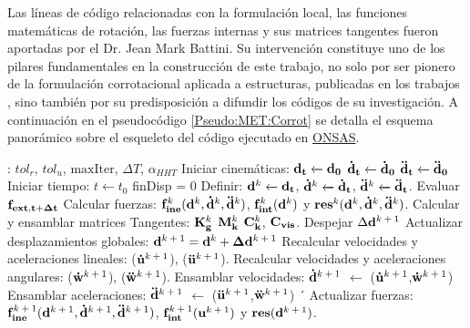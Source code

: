 Las líneas de código relacionadas con la formulación local, las funciones matemáticas de rotación, las fuerzas internas y sus matrices tangentes fueron aportadas por el Dr. Jean Mark Battini. Su intervención constituye uno de los pilares fundamentales en la construcción de este trabajo, no solo por ser pionero de la formulación corrotacional aplicada a estructuras, publicadas en los trabajos \citep{Battini2002} \citep{Le2014}, sino también por su predisposición a difundir los códigos de su investigación. A continuación en el pseudocódigo \ref{Pseudo:MET:Corrot} se detalla el esquema panorámico sobre el esqueleto del código ejecutado en \href{https://github.com/ONSAS/ONSAS.m/}{ONSAS}. 

\begin{algorithm}
	\begin{algorithmic} 
		\REQUIRE: $tol_r$, $tol_u$, $\text{maxIter}$, $\Delta T$, $\alpha_{HHT}$
		\STATE Iniciar cinemáticas: $\bf{d_t}\xleftarrow[]{}\bf{d_0}$
		$\bf{\dot{d}_t}\xleftarrow[]{}\bf{\dot{d}_0}$
		$\bf{\ddot{d}_t}\xleftarrow[]{}\bf{\ddot{d}_0}$ 
		\STATE Iniciar tiempo: $t\xleftarrow{}t_0$
		\STATE finDisp = $0$
		\STATE Definir: $\bf{d^\text{$k$}}\xleftarrow[]{}\bf{d_t}$, $\bf{\dot{d}^\text{$k$}}\xleftarrow[]{}\bf{\dot{d}_t}$, $\bf{\ddot{d}^\text{$k$}}\xleftarrow[]{}\bf{\ddot{d}_t}$.
		\STATE Evaluar $\bf{f_{ext,t+\Delta t}}$	
		\STATE Calcular fuerzas: $\bf{f}_{ine}^\text{$k$}(\bf{d}^\text{$k$},\bf{\dot{d}}^\text{$k$},\bf{\ddot{d}}^\text{$k$})$,  $\bf{f}_{int}^\text{$k$}(\bf{d}^\text{$k$})$ y $\bf{res}^{\text{$k$}}(\bf{d}^\text{$k$},\bf{\dot{d}}^\text{$k$},\bf{\ddot{d}}^\text{$k$})$. 
		\STATE Calcular y ensamblar matrices Tangentes: $\bf{K}_g^\text{$k$}$ $\bf{M}_k^\text{$k$}$  $\bf{C}_k^\text{$k$}$, $\bf{C}_{vis}$. 
		\STATE Despejar $\Delta \bf{d}^\text{$k+1$}$ 
		\STATE Actualizar desplazamientos globales:  $\bf{d}^\text{$k+1$} = \bf{d}^\text{$k$} + \Delta\bf{d}^\text{$k+1$}$ 
		\STATE Recalcular velocidades y aceleraciones lineales: ($\bf{\dot{u}}^\text{$k+1$}$), ($\bf{\ddot{u}}^\text{$k+1$}$).
		\STATE Recalcular velocidades y aceleraciones angulares: ($\bf{\dot{w}}^\text{$k+1$}$), ($\bf{\ddot{w}}^\text{$k+1$}$).
		\STATE Ensamblar velocidades: $\bf{\dot{d}}^\text{$k+1$}$ $\leftarrow$ ($\bf{\dot{u}}^\text{$k+1$}$,$\bf{\dot{w}}^\text{$k+1$}$)
		\STATE Ensamblar aceleraciones: $\bf{\ddot{d}}^\text{$k+1$}$ $\leftarrow$ ($\bf{\ddot{u}}^\text{$k+1$}$,$\bf{\ddot{w}}^\text{$k+1$}$)
		´				\STATE Actualizar fuerzas: 	$\bf{f}_{ine}^\text{$k+1$}(\bf{d}^\text{$k+1$},\bf{\dot{d}}^\text{$k+1$},\bf{\ddot{d}}^\text{$k+1$})$,  $\bf{f}_{int}^\text{$k+1$}(\bf{u}^\text{$k+1$})$ y $\bf{res}(\bf{d}^\text{$k+1$})$. 

\end{algorithmic}
\end{algorithm}
